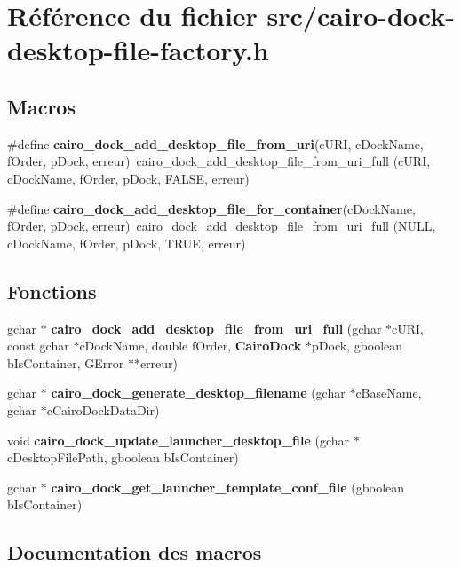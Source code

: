 \section{Référence du fichier src/cairo-dock-desktop-file-factory.h}
\label{cairo-dock-desktop-file-factory_8h}
\subsection*{Macros}
\begin{CompactItemize}
\item 
\#define {\bf cairo\_\-dock\_\-add\_\-desktop\_\-file\_\-from\_\-uri}(cURI, cDockName, fOrder, pDock, erreur)~cairo\_\-dock\_\-add\_\-desktop\_\-file\_\-from\_\-uri\_\-full (cURI, cDockName, fOrder, pDock, FALSE, erreur)
\item 
\#define {\bf cairo\_\-dock\_\-add\_\-desktop\_\-file\_\-for\_\-container}(cDockName, fOrder, pDock, erreur)~cairo\_\-dock\_\-add\_\-desktop\_\-file\_\-from\_\-uri\_\-full (NULL, cDockName, fOrder, pDock, TRUE, erreur)
\end{CompactItemize}
\subsection*{Fonctions}
\begin{CompactItemize}
\item 
gchar $\ast$ {\bf cairo\_\-dock\_\-add\_\-desktop\_\-file\_\-from\_\-uri\_\-full} (gchar $\ast$cURI, const gchar $\ast$cDockName, double fOrder, {\bf CairoDock} $\ast$pDock, gboolean bIsContainer, GError $\ast$$\ast$erreur)
\item 
gchar $\ast$ {\bf cairo\_\-dock\_\-generate\_\-desktop\_\-filename} (gchar $\ast$cBaseName, gchar $\ast$cCairoDockDataDir)
\item 
void {\bf cairo\_\-dock\_\-update\_\-launcher\_\-desktop\_\-file} (gchar $\ast$cDesktopFilePath, gboolean bIsContainer)
\item 
gchar $\ast$ {\bf cairo\_\-dock\_\-get\_\-launcher\_\-template\_\-conf\_\-file} (gboolean bIsContainer)
\end{CompactItemize}


\subsection{Documentation des macros}
